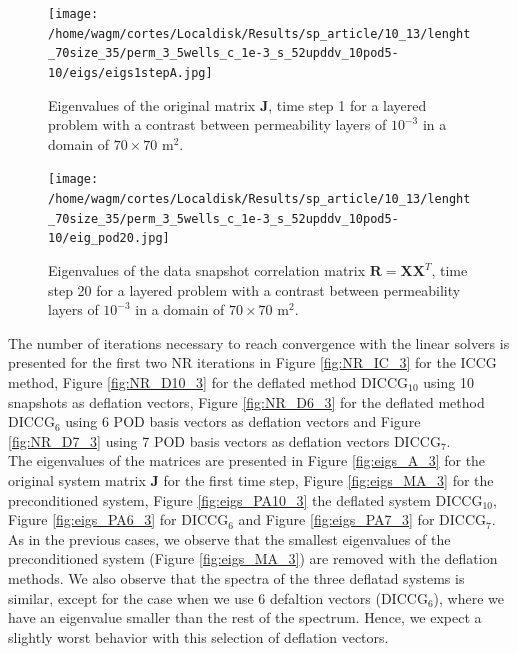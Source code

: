 \documentclass[12pt]{article}
\begin{document}
\begin{figure}[!h]
\centering
\begin{minipage}{.4\textwidth}
 \centering
 \vspace{-3mm}
\texttt{[image: /home/wagm/cortes/Localdisk/Results/sp\_article/10\_13/lenght\_70size\_35/perm\_3\_5wells\_c\_1e-3\_s\_52upddv\_10pod5-10/eigs/eigs1stepA.jpg]}
 \vspace{-10pt}
\caption{Eigenvalues of the original matrix $\mathbf{J}$, time step 1 for a layered problem with a contrast between permeability layers of $10^{-3}$ in a domain of $70 \times 70$ m$^2$.}\label{fig:eigs_A_3}
\end{minipage}%
\hspace{1cm}
\begin{minipage}{.4\textwidth}
 \centering
\texttt{[image: /home/wagm/cortes/Localdisk/Results/sp\_article/10\_13/lenght\_70size\_35/perm\_3\_5wells\_c\_1e-3\_s\_52upddv\_10pod5-10/eig\_pod20.jpg]}
\caption{Eigenvalues of the data snapshot correlation matrix $\mathbf{R}=\mathbf{X}\mathbf{X}^T$, time step 20 for a layered problem with a contrast between permeability layers of $10^{-3}$ in a domain of $70 \times 70$ m$^2$.}
\label{fig:eig_POD_3}
\end{minipage}
\end{figure}

 The number of iterations necessary to reach convergence with the linear solvers is presented for the first two NR iterations in Figure \ref{fig:NR_IC_3} for the ICCG method, Figure \ref{fig:NR_D10_3} for the deflated method DICCG$_{10}$ using 10 snapshots as deflation vectors, Figure \ref{fig:NR_D6_3} for the deflated method DICCG$_6$ using 6 POD basis vectors as deflation vectors and Figure \ref{fig:NR_D7_3} using 7 POD basis vectors as deflation vectors DICCG$_7$.\\
The eigenvalues of the matrices are presented in Figure \ref{fig:eigs_A_3} for the original system matrix $\mathbf{J}$ for the first time step, Figure \ref{fig:eigs_MA_3} for the preconditioned system, Figure \ref{fig:eigs_PA10_3} the deflated system DICCG$_{10}$, Figure \ref{fig:eigs_PA6_3} for DICCG$_6$ and Figure \ref{fig:eigs_PA7_3} for DICCG$_7$. As in the previous cases, we observe that the smallest eigenvalues of the preconditioned system (Figure \ref{fig:eigs_MA_3}) are removed with the deflation methods. We also observe that the spectra of the three deflatad systems is similar, except for the case when we use 6 defaltion vectors (DICCG$_6$), where we have an eigenvalue smaller than the rest of the spectrum. Hence, we expect a slightly worst behavior with this selection of deflation vectors. \\
\end{document}
